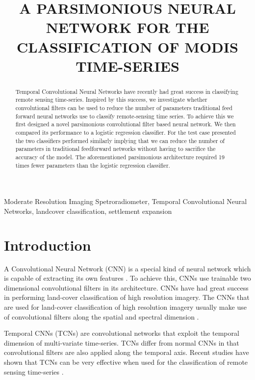 \documentclass{article}
\title{A PARSIMONIOUS NEURAL NETWORK FOR THE CLASSIFICATION OF MODIS TIME-SERIES}
\begin{document}
%
\maketitle
%
\begin{abstract}
Temporal Convolutional Neural Networks have recently had great success in classifying remote sensing time-series. Inspired by this success, we  investigate whether convolutional filters can be used to reduce the number of parameters traditional feed forward neural networks use to classify remote-sensing time series. To achieve this we first designed a novel parsimonious convolutional filter based neural network. We then compared its performance to a logistic regression classifier. For the test case presented the two classifiers performed similarly implying that we can reduce the number of parameters in traditional feedforward networks without having to sacrifice the accuracy of the model. The aforementioned parsimonious architecture required 19 times fewer parameters than the logistic regression classifier.     
\end{abstract}
% 
\begin{keywords}
Moderate Resolution Imaging Spetroradiometer, Temporal Convolutional Neural Networks, landcover classification, settlement expansion
\end{keywords}  
%
\section{Introduction}
\label{sec:intro}
A Convolutional Neural Network (CNN) is a special kind of neural network which is capable of extracting its own features \cite{goodfellow2016}. To achieve this, CNNs use trainable two dimensional convolutional filters in its architecture. CNNs have had great success in performing land-cover classification of high resolution imagery. The CNNs that are used for land-cover classification of high resolution imagery usually make use of convolutional filters along the spatial and spectral dimension \cite{volpi2016}.

Temporal CNNs (TCNs) are convolutional networks that
exploit the temporal dimension of multi-variate time-series. TCNs differ from normal CNNs in that convolutional filters are also applied along the temporal axis. Recent studies have shown that TCNs can be very effective when used for the classification of remote sensing time-series \cite{zhong2019,pelletier2019, zhao2019, fawaz2020}.   
\end{document}
